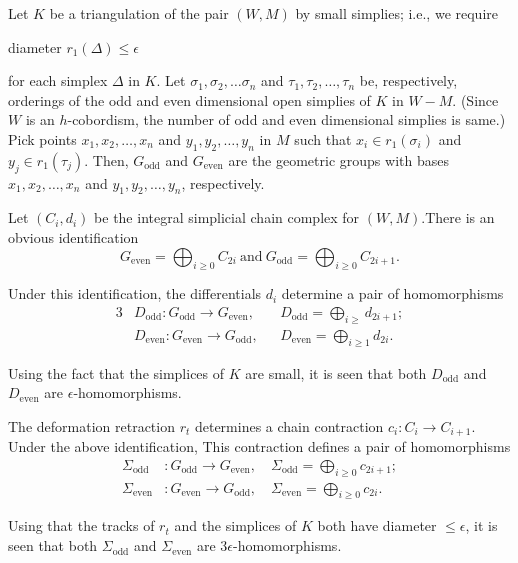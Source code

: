 Let $K$ be a triangulation of the pair $(W, M)$ by small simplies;
i.e., we require
\begin{center}
  diameter $r_1 (\Delta) \leq \epsilon$
\end{center}
for each simplex $\Delta$ in $K$. Let $\sigma_1, \sigma_2, \ldots
\sigma_n$ and $\tau_1, \tau_2, \ldots, \tau_n$ be, respectively,
orderings of the odd and even dimensional open simplies of $K$ in
$W-M$. (Since $W$ is an $h$-cobordism, the number of odd and even
dimensional simplies is same.) Pick points $x_1, x_2, \ldots, x_n$ and
$y_1, y_2, \ldots, y_n$ in $M$ such that $x_i \in r_1 (\sigma_i)$ and
$y_j \in r_1 (\tau_j)$. Then, $G_{\text{odd}}$ and $G_{\text{even}}$
are the geometric groups with bases $x_1, x_2, \ldots, x_n$ and $y_1,
y_2, \ldots , y_n$, respectively.

Let $(C_i, d_i)$ be the integral simplicial chain complex for $(W,
M)$.\break There is an obvious identification
\begin{equation*}
  G_{\text{even}} = \bigoplus_{i \geq 0} C_{2i}~\text{and}~
  G_{\text{odd}}= \bigoplus_{i \geq 0} C_{2i +1}.\tag{0}\label{c11:eq0}
\end{equation*}

Under this identification, the differentials $d_i$ determine a pair of
homomorphisms 
\begin{alignat*}{3}
  &D_{\text{odd}}  : G_{\text{odd}} \to G_{\text{even}}, 
  \quad & D_{\text{odd}} = \bigoplus_{i \geq} d_{2i+1};\\
  & D_{\text{even}}   : G_{\text{even}} \to G_{\text{odd}}, &
  D_{\text{even}}= \bigoplus_{i \geq 1} d_{2i}.
\end{alignat*}

Using the fact that the simplices of $K$ are small, it is seen that
both $D_{\text{odd}}$ and $D_{\text{even}}$ are
$\epsilon$-homomorphisms. 

The deformation retraction $r_t$ determines a chain contraction $c_i:
C_i \to C_{i+1}$. Under the above identification, This contraction
defines a pair of homomorphisms
\begin{align*}
  \Sigma_{\text{odd}} & : G_{\text{odd}} \to G_{\text{even}},\quad
  \Sigma_{\text{odd}} = \bigoplus_{i \geq 0} c_{2i+1};\\
  \Sigma_{\text{even}} & : G_{\text{even}} \to G_{\text{odd}},\quad
  \Sigma_{\text{even}}= \bigoplus_{i \geq 0} c_{2i}.
\end{align*}

Using that the tracks of $r_t$ and the simplices of $K$ both have
diameter $\leq \epsilon$, it is seen that both $\Sigma_{\text{odd}}$
and $\Sigma_{\text{even}}$ are $3 \epsilon$-homomorphisms.

